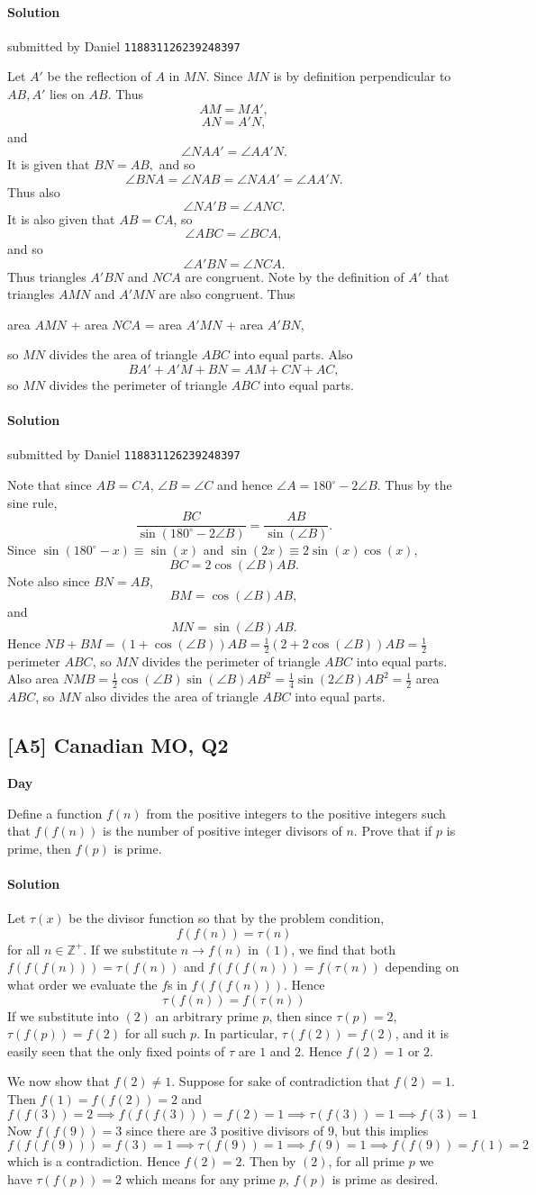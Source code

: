 \documentclass[10pt]{article}
\newcommand{\themonth}{March}
\newcommand{\theyear}{2019}
\newcounter{day}
\newcounter{solution}
\newcounter{datenumber}
\newcommand{\problem}[4][0]{
	\newpage
	\subsection{[#3] \space #2} \hfill 
	{\large\textbf{Day \arabic{day}}} %
	\begin{flushleft} #4 \end{flushleft}
	\vspace{1em}
	\addtocounter{day}{1}
	\addtocounter{datenumber}{1}
	\setcounter{solution}{1}
}
\newcommand{\solution}[4][0]{
	\paragraph{Solution \arabic{solution}} \hfill submitted by #2 \hfill \texttt{#3}
	\begin{flushleft} #4 \end{flushleft}
	\addtocounter{solution}{1}
	\vspace{1em}
}
\newcommand{\anonsolution}[2][0]{
	\paragraph{Solution \arabic{solution}} 
	\begin{flushleft} #2 \end{flushleft}
	\addtocounter{solution}{1}
	\vspace{1em}
}
\begin{document}
\solution[8]{Daniel}{118831126239248397}{Let $A'$ be the reflection of $A$ in $MN$. Since $MN$ is by definition perpendicular to $AB, A'$ lies on $AB$. Thus $$AM = MA',$$ $$AN = A'N,$$ and $$\angle NAA' = \angle AA'N.$$ It is given that $BN = AB,$ and so $$\angle BNA = \angle NAB = \angle NAA' = \angle AA'N.$$ Thus also $$\angle NA'B = \angle ANC.$$ It is also given that $AB = CA$, so $$\angle ABC = \angle BCA,$$ and so $$\angle A'BN = \angle NCA.$$ Thus triangles $A'BN$ and $NCA$ are congruent. Note by the definition of $A'$ that triangles $AMN$ and $A'MN$ are also congruent. Thus \begin{center}area $AMN$ + area $NCA$ = area $A'MN$ + area $A'BN$,\end{center} so $MN$ divides the area of triangle $ABC$ into equal parts. Also $$BA' + A'M + BN = AM + CN + AC,$$ so $MN$ divides the perimeter of triangle $ABC$ into equal parts.}

\solution[8]{Daniel}{118831126239248397}{Note that since $AB = CA$, $\angle B = \angle C$ and hence $\angle A = 180^{\circ} - 2\angle B$. Thus by the sine rule, $$\frac{BC}{\sin(180^{\circ} - 2\angle B)} = \frac{AB}{\sin(\angle B)}.$$ Since $\sin(180^{\circ}-x) \equiv \sin(x)$ and $\sin(2x) \equiv 2\sin(x)\cos(x)$, $$BC = 2\cos(\angle B) AB.$$ Note also since $BN = AB$, $$BM = \cos(\angle B) AB,$$ and $$MN = \sin(\angle B)AB.$$ Hence $NB + BM = (1 + \cos(\angle B)) AB = \frac{1}{2} (2 + 2\cos(\angle B))AB = \frac{1}{2}$ perimeter $ABC$, so $MN$ divides the perimeter of triangle $ABC$ into equal parts. Also area $NMB = \frac{1}{2} \cos(\angle B)\sin(\angle B) AB^2 = \frac{1}{4} \sin(2\angle B) AB^2 = \frac{1}{2}$ area $ABC$, so $MN$ also divides the area of triangle $ABC$ into equal parts.}

\problem[9]{2017 Canadian MO, Q2}{A5}{Define a function $f(n)$ from the positive integers to the positive integers such that $f(f(n))$ is the number of positive integer divisors of $n$. Prove that if $p$ is prime, then $f(p)$ is prime.}

\anonsolution[9]{Let \(\tau(x)\) be the divisor function so that by the problem condition, \[f(f(n))=\tau(n) \tag{1}\] for all \(n\in\mathbb{Z^+}\). If we substitute \(n\to f(n)\) in \((1)\), we find that both \(f(f(f(n)))=\tau(f(n))\) and \(f(f(f(n)))=f(\tau(n))\) depending on what order we evaluate the \(f\)s in \(f(f(f(n)))\). Hence \[\tau(f(n))=f(\tau(n))\tag{2}\] If we substitute into \((2)\) an arbitrary prime \(p\), then since \(\tau(p)=2\), \(\tau(f(p))=f(2)\) for all such \(p\).  In particular, \(\tau(f(2))=f(2)\), and it is easily seen that the only fixed points of \(\tau\) are \(1\) and \(2\). Hence \(f(2)=1\) or \(2\). 


We now show that \(f(2)\neq 1\). Suppose for sake of contradiction that \(f(2)=1\). Then \(f(1)=f(f(2))=2\) and \[f(f(3))=2 \implies f(f(f(3)))=f(2)=1 \implies \tau(f(3))=1 \implies f(3)=1\] Now \(f(f(9))=3\) since there are \(3\) positive divisors of \(9\), but this implies \[f(f(f(9)))=f(3)=1 \implies  \tau(f(9))=1 \implies f(9)=1 \implies f(f(9))=f(1)=2\] which is a contradiction. Hence \(f(2)=2\). Then by \((2)\), for all prime \(p\) we have \(\tau(f(p))=2\) which means for any prime \(p\), \(f(p)\) is prime as desired.} 
\end{document}
